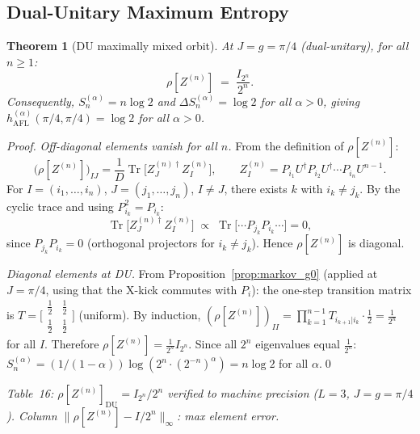 \documentclass[12pt,a4paper]{article}
\newtheorem{theorem}{Theorem}[section]
\begin{document}
\subsection{Dual-Unitary Maximum Entropy}

\begin{theorem}[DU maximally mixed orbit]\label{thm:du_mixed}
At $J=g=\pi/4$ (dual-unitary), for all $n\ge 1$:
\begin{equation}\label{eq:du_mixed}
  \rho[Z^{(n)}] \;=\; \frac{I_{2^n}}{2^n}.
\end{equation}
Consequently, $S^{(\alpha)}_n = n\log 2$ and $\Delta S^{(\alpha)}_n = \log 2$ for all
$\alpha>0$, giving $h^{(\alpha)}_\mathrm{AFL}(\pi/4,\pi/4) = \log 2$ for all $\alpha>0$.
\end{theorem}

\begin{proof}
\textit{Off-diagonal elements vanish for all $n$.}
From the definition of $\rho[Z^{(n)}]$:
\[
  \bigl(\rho[Z^{(n)}]\bigr)_{IJ}
  = \frac{1}{D}\operatorname{Tr}\bigl[Z_J^{(n)\dagger} Z_I^{(n)}\bigr],
  \qquad
  Z_I^{(n)} = P_{i_1}U^\dagger P_{i_2}U^\dagger\cdots P_{i_n}U^{n-1}.
\]
For $I=(i_1,\ldots,i_n)$, $J=(j_1,\ldots,j_n)$, $I\ne J$, there exists $k$ with
$i_k\ne j_k$.  By the cyclic trace and using $P_{i_k}^2=P_{i_k}$:
\[
  \operatorname{Tr}\bigl[Z_J^{(n)\dagger}Z_I^{(n)}\bigr]
  \;\propto\; \operatorname{Tr}\bigl[\cdots P_{j_k}P_{i_k}\cdots\bigr] = 0,
\]
since $P_{j_k}P_{i_k}=0$ (orthogonal projectors for $i_k\ne j_k$).
Hence $\rho[Z^{(n)}]$ is diagonal.

\textit{Diagonal elements at DU.}
From Proposition~\ref{prop:markov_g0} (applied at $J=\pi/4$, using that the
X-kick commutes with $P_i$):
the one-step transition matrix is $T=\bigl[\begin{smallmatrix}\frac{1}{2}&\frac{1}{2}\\
\frac{1}{2}&\frac{1}{2}\end{smallmatrix}\bigr]$ (uniform).
By induction, $(\rho[Z^{(n)}])_{II} = \prod_{k=1}^{n-1}T_{i_{k+1}|i_k}\cdot\tfrac{1}{2}
= \tfrac{1}{2^n}$ for all $I$.
Therefore $\rho[Z^{(n)}] = \frac{1}{2^n}I_{2^n}$.
Since all $2^n$ eigenvalues equal $\tfrac{1}{2^n}$:
$S^{(\alpha)}_n=(1/(1-\alpha))\log(2^n\cdot(2^{-n})^\alpha)=n\log 2$ for all $\alpha$.\qed
\end{proof}

\noindent\textit{Table~16: $\rho[Z^{(n)}]_\mathrm{DU}=I_{2^n}/2^n$ verified to
machine precision ($L=3$, $J=g=\pi/4$).
Column $\|\rho[Z^{(n)}]-I/2^n\|_\infty$: max element error.}
\end{document}
